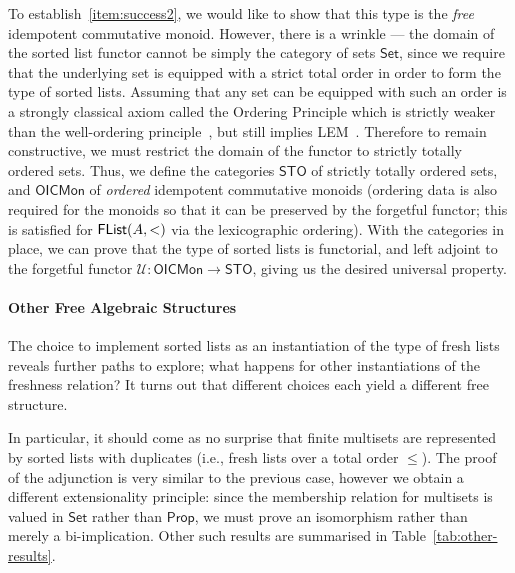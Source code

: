 \documentclass[a4paper]{easychair}
\newcommand{\AgdaFontStyle}[1]{\textsf{#1}}
\newcommand{\AgdaFormat}[2]{#2}
\newcommand{\AgdaNoSpaceMath}[1]
    {\begingroup\thickmuskip=0mu\medmuskip=0mu#1\endgroup}
\newcommand{\AgdaDatatype}[1]
    {\AgdaNoSpaceMath{\textcolor{AgdaDatatype}{\AgdaFontStyle{\AgdaFormat{#1}{{#1}}}}}}
\newcommand{\flistsymb}{\AgdaDatatype{FList}}
\newcommand{\flist}[2]{\ensuremath{\flistsymb(#1,#2)}}
\newcommand\setuniv{\mathsf{Set}} %
\newcommand\propuniv{\mathsf{Prop}} %
\newcommand\sto{\mathsf{STO}}
\newcommand\oicm{\mathsf{OICMon}}
\newcommand{\Forget}{\mathcal{U}}
\newcommand\forgetoicm{\Forget : \oicm{} \to{} \sto{}}
\begin{document}
To establish~\eqref{item:success2}, we would like to show that this type is the \emph{free} idempotent commutative monoid.
However, there is a wrinkle --- the domain of the sorted list functor cannot be simply the category of sets $\setuniv$, since we require that the underlying set is equipped with a strict total order in order to form the type of sorted lists.
Assuming that any set can be equipped with such an order is a strongly classical axiom called the Ordering Principle which is strictly weaker than the well-ordering principle~\cite[Ch. 5 \S 5]{jech1973choice}, but still implies LEM~\cite{swanOPLEM}.
Therefore to remain constructive, we must restrict the domain of the functor to strictly totally ordered sets.
%
Thus, we define the categories $\sto$ of strictly totally ordered sets, and
$\oicm$ of \emph{ordered} idempotent commutative monoids (ordering data is also required for the monoids so that it can be preserved by the forgetful functor; this is satisfied for \flist{A}{<} via the lexicographic ordering).
With the categories in place, we can prove that the type of sorted lists is functorial, and left adjoint to the forgetful functor $\forgetoicm$, giving us the desired universal property.

\paragraph{Other Free Algebraic Structures}

The choice to implement sorted lists as an instantiation of the type of fresh lists reveals further paths to explore;
what happens for other instantiations of the freshness relation?
It turns out that different choices each yield a different free structure.

In particular, it should come as no surprise that finite multisets are represented by sorted lists with duplicates (i.e., fresh lists over a total order $\leq$).
The proof of the adjunction is very similar to the previous case,
however we obtain a different extensionality principle:
since the membership relation for multisets is valued in $\setuniv$ rather than $\propuniv$, we must prove an isomorphism rather than merely a bi-implication.
%
Other such results are summarised in Table~\ref{tab:other-results}.
\end{document}
